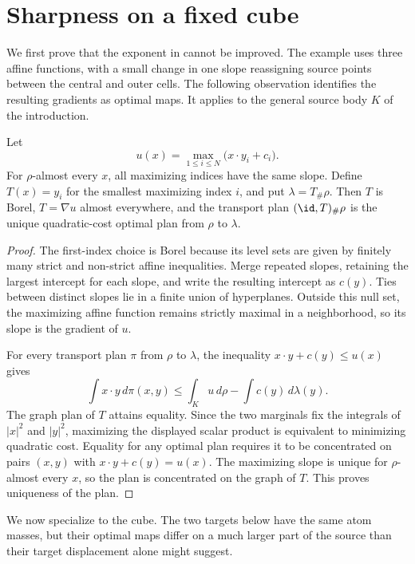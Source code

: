 \section{Sharpness on a fixed cube}
\label{sec:sharpness}

We first prove that the exponent in  cannot be
improved. The example uses three affine functions, with a small change
in one slope reassigning source points between the central and outer
cells. The following observation identifies the resulting gradients as
optimal maps. It applies to the general source body $K$ of the introduction.

\begin{lemma}
\label{cells:optimality}
Let
\[
 u(x)=\max_{1\le i\le N}\bigl(x\cdot y_i+c_i\bigr).
\]
For $\rho$-almost every $x$, all maximizing indices have the same slope.
Define $T(x)=y_i$ for the smallest maximizing index $i$, and put
$\lambda=T_\#\rho$. Then $T$ is Borel, $T=\nabla u$ almost everywhere, and
the transport plan $(\id,T)_\#\rho$ is the unique quadratic-cost optimal
plan from $\rho$ to $\lambda$.
\end{lemma}

\begin{proof}
The first-index choice is Borel because its level sets are given by
finitely many strict and non-strict affine inequalities.
Merge repeated slopes, retaining the largest intercept for each slope, and
write the resulting intercept as $c(y)$. Ties between distinct slopes lie
in a finite union of hyperplanes. Outside this null set, the maximizing
affine function remains strictly maximal in a neighborhood, so its slope
is the gradient of $u$.

For every transport plan $\pi$ from $\rho$ to $\lambda$, the inequality
$x\cdot y+c(y)\le u(x)$ gives
\[
 \int x\cdot y\,d\pi(x,y)
 \le \int_K u\,d\rho-\int c(y)\,d\lambda(y).
\]
The graph plan of $T$ attains equality. Since the two marginals fix the
integrals of $|x|^2$ and $|y|^2$, maximizing the displayed scalar product is
equivalent to minimizing quadratic cost. Equality for any optimal plan
requires it to be concentrated on pairs $(x,y)$ with
$x\cdot y+c(y)=u(x)$. The maximizing slope is unique for $\rho$-almost every
$x$, so the plan is concentrated on the graph of $T$. This proves
uniqueness of the plan.
\end{proof}

We now specialize to the cube. The two targets below have the same atom
masses, but their optimal maps differ on a much larger part of the source
than their target displacement alone might suggest.

